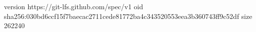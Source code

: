 version https://git-lfs.github.com/spec/v1
oid sha256:030bd6ccf15f7baecac2711cede81772ba4c343520553eea3b360743ff9c52df
size 262240
